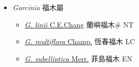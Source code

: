 
  \begin{itemize}
 \item[] \textit{Garcinia} 福木屬
                    
  \begin{itemize}
        \item[] \href{http://www.theplantlist.org/tpl1.1/search?q=Garcinia+linii}{\textit{G. linii} C.E.Chang}   蘭嶼福木\# NT
        \item[] \href{http://www.theplantlist.org/tpl1.1/search?q=Garcinia+multiflora}{\textit{G. multiflora} Champ.}   恆春福木 LC
        \item[] \href{http://www.theplantlist.org/tpl1.1/search?q=Garcinia+subelliptica}{\textit{G. subelliptica} Merr.}   菲島福木 EN
  \end{itemize}
  \end{itemize}
